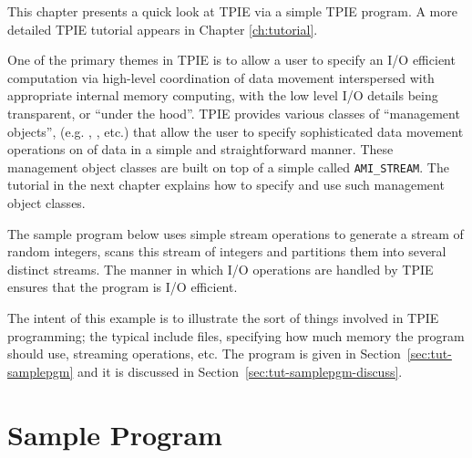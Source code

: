 This chapter presents a quick look
at TPIE via a simple TPIE program. A more detailed TPIE
tutorial appears in Chapter \ref{ch:tutorial}. 

One of the primary themes in TPIE is to allow a user to
specify an I/O efficient computation via 
high-level coordination of data movement interspersed with
appropriate internal memory computing, with the low level I/O
details being transparent, or ``under the hood''.
TPIE provides various classes of ``management objects'',
(e.g. , , etc.) that
allow the user to specify sophisticated data movement
operations on  of data in a simple and
straightforward manner. These management object classes are
built on top of a simple  called
\lstinline|AMI_STREAM|. The tutorial in the next chapter explains
how to specify and use such management object classes.

The sample program below uses simple stream
operations %
to generate a stream of random integers, scans this stream
of integers and partitions them into several distinct
streams. The manner in which I/O operations are handled by
TPIE ensures that the program is I/O efficient.


The intent of this example is to illustrate the sort of
things involved in TPIE programming; the typical include
files, specifying how much memory the program should use,
streaming operations, etc. The program is given in
Section~\ref{sec:tut-samplepgm} and it is discussed in
Section~\ref{sec:tut-samplepgm-discuss}.


\section{Sample Program}

